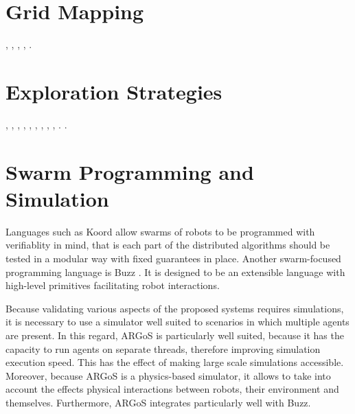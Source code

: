 \section{Grid Mapping}
\cite{kobayashiSharingExploringInformation2002}, \cite{kobayashiDeterminationExplorationTarget2003}, \cite{indelmanCooperativeMultirobotBelief2018},
\cite{hanGridWiseControlMultiAgent},
\cite{panovGridPathPlanning2018}.

\section{Exploration Strategies}
\cite{undurti2010online}, \cite{thiebaux2016rao}, \cite{xiao2020robot},
\cite{luo2019voronoi}, \cite{santos2019decentralized}, \cite{xu2019multi}, \cite{wang2011frontier}, \cite{topiwala2018frontier},
\cite{dames2012decentralized}, \cite{schwagerMultirobotControlPolicy2017}. \cite{yamauchi1998frontier}.

\section{Swarm Programming and Simulation}
Languages such as Koord \cite{ghosh2020koord} allow swarms of robots to be programmed with verifiablity in mind, that is each part of the distributed algorithms should be tested in a modular way with fixed guarantees in place. Another swarm-focused programming language is Buzz \cite{pinciroliBuzz2016}. It is designed to be an extensible language with high-level primitives facilitating robot interactions.

Because validating various aspects of the proposed systems requires simulations, it is necessary to use a simulator well suited to scenarios in which multiple agents are present. In this regard, ARGoS  \cite{Pinciroli:SI2012} is particularly well suited, because it has the capacity to run agents on separate threads, therefore improving simulation execution speed. This has the effect of making large scale simulations accessible. Moreover, because ARGoS is a physics-based simulator, it allows to take into account the effects physical interactions between robots, their environment and themselves. Furthermore, ARGoS integrates particularly well with Buzz.